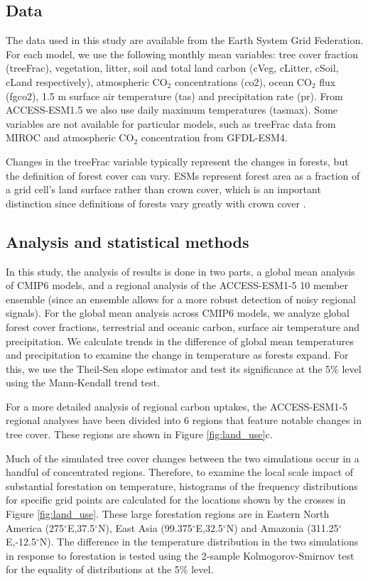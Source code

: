 \documentclass[draft]{agujournal2019}
\begin{document}
\subsection{Data}

The data used in this study are available from the Earth System Grid Federation.
For each model, we use the following monthly mean variables: tree cover fraction (treeFrac), vegetation, litter, soil and total land carbon (cVeg, cLitter, cSoil, cLand respectively), atmospheric CO$_2$ concentrations (co2), ocean CO$_2$ flux (fgco2), 1.5 m surface air temperature (tas) and precipitation rate (pr).
From ACCESS-ESM1.5 we also use daily maximum temperatures (tasmax).
Some variables are not available for particular models, such as treeFrac data from MIROC and atmospheric CO$_2$ concentration from GFDL-ESM4.

Changes in the treeFrac variable typically represent the changes in forests, but the definition of forest cover can vary.
ESMs represent forest area as a fraction of a grid cell's land surface rather than crown cover, which is an important distinction since definitions of forests vary greatly with crown cover \cite{zomer_land_2008}.

\subsection{Analysis and statistical methods}

In this study, the analysis of results is done in two parts, a global mean analysis of CMIP6 models, and a regional analysis of the ACCESS-ESM1-5 10 member ensemble (since an ensemble allows for a more robust detection of noisy regional signals).
For the global mean analysis across CMIP6 models, we analyze global forest cover fractions, terrestrial and oceanic carbon, surface air temperature and precipitation. We calculate trends in the difference of global mean temperatures and precipitation to examine the change in temperature as forests expand.
For this, we use the Theil-Sen slope estimator and test its significance at the 5\% level using the Mann-Kendall trend test.

For a more detailed analysis of regional carbon uptakes, the ACCESS-ESM1-5 regional analyses have been divided into 6 regions that feature notable changes in tree cover.
These regions are shown in Figure \ref{fig:land_use}c.

Much of the simulated tree cover changes between the two simulations occur in a handful of concentrated regions.
Therefore, to examine the local scale impact of substantial forestation on temperature, histograms of the frequency distributions for specific grid points are calculated for the locations shown by the crosses in Figure \ref{fig:land_use}.
These large forestation regions are in Eastern North America (275$^\circ$E,37.5$^\circ$N), East Asia (99.375$^\circ$E,32.5$^\circ$N) and Amazonia (311.25$^\circ$E,-12.5$^\circ$N).
The difference in the temperature distribution in the two simulations in response to forestation is tested using the 2-sample Kolmogorov-Smirnov test for the equality of distributions at the 5\% level.
\end{document}
